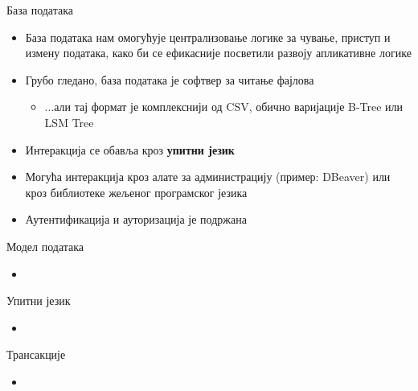 \documentclass{beamer}
\begin{document}
    \begin{frame}{База података}
        \begin{itemize}
            \item База података нам омогућује централизовање логике за чување, приступ и измену података, како би се ефикасније посветили развоју апликативне логике
            \item Грубо гледано, база података је софтвер за читање фајлова
            \begin{itemize}
                \item ...али тај формат је комплекснији од CSV, обично варијације B-Tree или LSM Tree
            \end{itemize}
            \item Интеракција се обавља кроз \textbf{упитни језик}
            \item Могућа интеракција кроз алате за администрацију (пример: DBeaver) или кроз библиотеке жељеног програмског језика
            \item Аутентификација и ауторизација је подржана
        \end{itemize}
    \end{frame}
    
    \begin{frame}{Модел података}
        \begin{itemize}
            \item 
        \end{itemize}
    \end{frame}
    
    \begin{frame}{Упитни језик}
        \begin{itemize}
            \item 
        \end{itemize}
    \end{frame}
    
    \begin{frame}{Трансакције}
        \begin{itemize}
            \item 
        \end{itemize}
    \end{frame}
    
\end{document}
